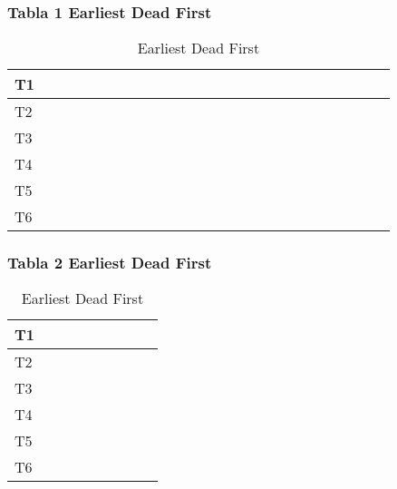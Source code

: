 \documentclass[xcolor=table]{beamer}
\begin{document}
\begin{frame} 
\frametitle{Tabla  1 Earliest Dead First } 
\begin{table} 
\centering 
\begin{tabular}{|l|l|l|l|l|l|l|l|l|l|l|l|l|l|l|l|l|l|l|l|l|l|l|l|l|} 
\hline 
T1 & & & & & & & & & & & & & & & & & & & & & & & & \\ \hline 
T2 & & & & & & & & & & & & & & & & \cellcolor{red} & \cellcolor{red} & \cellcolor{red} & \cellcolor{red} & \cellcolor{red} & \cellcolor{red} & \cellcolor{red} & \cellcolor{red} & \cellcolor{red} \\ \hline 
T3 & & & & & & & & & & & & \cellcolor{green} & \cellcolor{green} & \cellcolor{green} & \cellcolor{green} & & & & & & & & & \\ \hline 
T4 & & & & & & \cellcolor{gray} & \cellcolor{gray} & \cellcolor{gray} & \cellcolor{gray} & \cellcolor{gray} & \cellcolor{gray} & & & & & & & & & & & & & \\ \hline 
T5 & & & \cellcolor{yellow} & \cellcolor{yellow} & \cellcolor{yellow} & & & & & & & & & & & & & & & & & & & \\ \hline 
T6 & \cellcolor{orange} & \cellcolor{orange} & & & & & & & & & & & & & & & & & & & & & & \\ \hline 
\end{tabular} 
\caption{ Earliest Dead First } 
\end{table} 
\end{frame} 
\begin{frame} 
\frametitle{Tabla  2 Earliest Dead First } 
\begin{table} 
\centering 
\begin{tabular}{|l|l|l|l|l|l|l|l|l|} 
\hline 
T1 & & \cellcolor{blue} & \cellcolor{blue} & \cellcolor{blue} & \cellcolor{blue} & \cellcolor{blue} & & \\ \hline 
T2 & \cellcolor{red} & & & & & & & \\ \hline 
T3 & & & & & & & & \\ \hline 
T4 & & & & & & & & \\ \hline 
T5 & & & & & & & & \\ \hline 
T6 & & & & & & & & \\ \hline 
\end{tabular} 
\caption{ Earliest Dead First } 
\end{table} 
\end{frame} 
\end{document}

